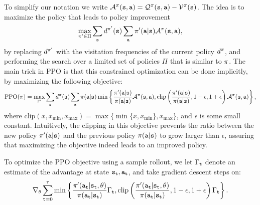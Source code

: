 To simplify our notation we write $\mathcal{A}^{\pi}({\tt s},{\tt a}) = \mathcal{Q}^{\pi}({\tt s},{\tt a}) - \mathcal{V}^{\pi}({\tt s})$. The idea is to maximize the policy that leads to policy improvement
\begin{equation*}
    \max_{\pi'\in \Pi}\sum_{{\tt s}} d^{\pi'}({\tt s}) \sum_{\tt a} \pi'({\tt a}|{\tt s})\mathcal{A}^{\pi}({\tt s},{\tt a}),
\end{equation*}
by replacing $d^{\pi'}$ with the visitation frequencies of the current policy $d^{\pi}$, and performing the search over a limited set of policies $\Pi$ that is similar to $\pi$. The main trick in PPO is that this constrained optimization can be done implicitly, by maximizing the following objective:
\begin{equation}\label{eq:PPO}
    \textrm{PPO}(\pi) = \max_{\pi'}\sum_{{\tt s}} d^{\pi}({\tt s}) \sum_{\tt a} \pi({\tt a}|{\tt s}) \min \left\{\frac{\pi'({\tt a}|{\tt s})}{\pi({\tt a}|{\tt s})}\mathcal{A}^{\pi}({\tt s},{\tt a}),  \textrm{clip}\left(\frac{\pi'({\tt a}|{\tt s})}{\pi({\tt a}|{\tt s})} , 1-\epsilon, 1+\epsilon\right)\mathcal{A}^{\pi}({\tt s},{\tt a}) \right\},
\end{equation}
where $\textrm{clip}\left(x , x_{\min}, x_{\max}\right) = \max\{\min\{x, x_{\min}\}, x_{\max}\}$, and $\epsilon$ is some small constant. Intuitively, the clipping in this objective prevents the ratio between the new policy $\pi'({\tt a}|{\tt s})$ and the previous policy $\pi({\tt a}|{\tt s})$ to grow larger than $\epsilon$, assuring that maximizing the objective indeed leads to an improved policy.

To optimize the PPO objective using a sample rollout, we let $\Gamma_{\tt t}$ denote an estimate of the advantage at state ${\tt s}_{\tt t}, {\tt a}_{\tt t}$, and take gradient descent steps on:
\begin{equation*}
    \nabla_{\theta}\sum_{{\tt t}=0}^\tau \min \left\{\frac{\pi'({\tt a}_{\tt t}|{\tt s}_{\tt t}, \theta)}{\pi({\tt a}_{\tt t}|{\tt s}_{\tt t})}\Gamma_{\tt t},  \textrm{clip}\left(\frac{\pi'({\tt a}_{\tt t}|{\tt s}_{\tt t}, \theta)}{\pi({\tt a}_{\tt t}|{\tt s}_{\tt t})} , 1-\epsilon, 1+\epsilon\right)\Gamma_{\tt t} \right\}.
\end{equation*}

